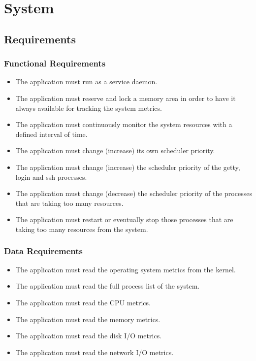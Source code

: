 \documentclass[conference]{IEEEtran}
\begin{document}
\section{System}

\subsection{Requirements}

\subsubsection{Functional Requirements}
\begin{itemize}
\item The application must run as a service daemon.
\item The application must reserve and lock a memory area in order to have it always available for tracking the system metrics.
\item The application must continuously monitor the system resources with a defined interval of time.
\item The application must change (increase) its own scheduler priority.
\item The application must change (increase) the scheduler priority of the getty, login and ssh processes.
\item The application must change (decrease) the scheduler priority of the processes that are taking too many resources.
\item The application must restart or eventually stop those processes that are taking too many resources from the system.
\end{itemize}
\subsubsection{Data Requirements}
\begin{itemize}
\item The application must read the operating system metrics from the kernel.
\item The application must read the full process list of the system.
\item The application must read the CPU metrics.
\item The application must read the memory metrics.
\item The application must read the disk I/O metrics.
\item The application must read the network I/O metrics.
\end{itemize}
\end{document}
